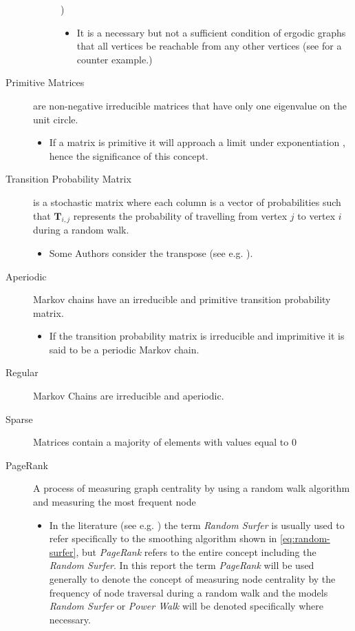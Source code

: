 \documentclass[11pt]{report}
\begin{document}
\begin{description}
\begin{description}
\cite{nathanaelackermancameronfreeralexkruckmanandrehanapatelProperlyErodicStructures2017,chenEigenvaluesInequalitiesErgodic2005})
\begin{itemize}
\item It is a necessary but not a sufficient condition of ergodic graphs that all vertices be reachable from any other vertices (see \cite{sazProbabilityTheoryThis} for a counter example.)
\end{itemize}
\end{description}
\item[{Primitive Matrices}] are non-negative irreducible matrices that have only one eigenvalue on the unit circle.
\begin{itemize}
\item If a matrix is primitive it will approach a limit under exponentiation \cite[]{langvilleGooglePageRankScience2012}, hence the significance of this concept.
\end{itemize}
\item[{Transition Probability Matrix}] is a stochastic matrix where each column is a vector of probabilities such that \(\mathbf{T}_{i,j}\) represents the probability of travelling from vertex \(j\) to vertex \(i\) during a random walk.
\begin{itemize}
\item Some Authors consider the transpose (see e.g. \cite{langvilleGooglePageRankScience2012}).
\end{itemize}
\item[{Aperiodic}] Markov chains have an irreducible and primitive transition probability matrix.
\begin{itemize}
\item If the transition probability matrix is irreducible and imprimitive it is said to be a periodic Markov chain.
\end{itemize}
\item[{Regular}] Markov Chains are irreducible and aperiodic.
\item[{Sparse}] Matrices contain a majority of elements with values equal to 0 \cite[]{langvilleGooglePageRankScience2012}
\item[{PageRank}] A process of measuring graph centrality by using a random walk algorithm and measuring the most frequent node
\begin{itemize}
\item In the literature (see e.g.
\cite{guptaWTFWhoFollow2013,langvilleGooglePageRankScience2012}) the term \emph{Random
Surfer} is usually used to refer specifically to the smoothing
algorithm shown in \eqref{eq:random-surfer}, but \emph{PageRank} refers to the entire concept including the \emph{Random Surfer}. In this report the term \emph{PageRank} will be used generally to denote the concept of measuring node centrality by the frequency of node traversal during a random walk and the models \emph{Random Surfer} or \emph{Power Walk} will be denoted specifically where necessary.
\end{itemize}
\end{description}
\end{document}
